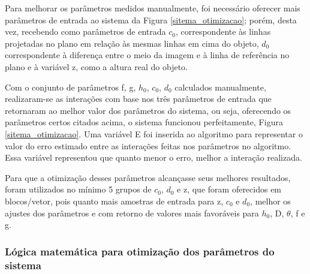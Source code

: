 \documentclass[a4paper, 12pt]{article}
\begin{document}
Para melhorar os parâmetros medidos manualmente, foi necessário oferecer mais parâmetros de entrada ao sistema da Figura \ref{sitema_otimizacao}; porém, desta vez, recebendo como parâmetros de entrada $c_0$, correspondente às linhas projetadas no plano em relação às mesmas linhas em cima do objeto, $d_0$ correspondente à diferença entre o meio da imagem e à linha de referência no plano e à variável z, como a altura real do objeto.

Com o conjunto de parâmetros f, g, $h_0$, $c_0$, $d_0$ calculados manualmente, realizaram-se as interações com base nos três parâmetros de entrada que retornaram ao melhor valor dos parâmetros do sistema, ou seja, oferecendo os parâmetros certos citados acima, o sistema funcionou perfeitamente, Figura \ref{sitema_otimizacao}. Uma variável E foi inserida ao algoritmo para representar o valor do erro estimado entre as interações feitas nos parâmetros no algoritmo. Essa variável representou que quanto menor o erro, melhor a interação realizada.

Para que a otimização desses parâmetros alcançasse seus melhores resultados, foram utilizados no mínimo 5 grupos de $c_0$, $d_0$ e z, que foram oferecidos em blocos/vetor, pois quanto mais amostras de entrada para z, $c_0$ e $d_0$, melhor os ajustes dos parâmetros e com retorno de valores mais favoráveis para $h_0$, D, $\theta$, f e g. 

\subsubsection{Lógica matemática para otimização dos parâmetros do sistema}
\end{document}

